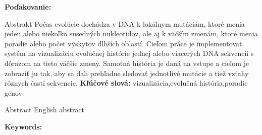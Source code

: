 \documentclass[12pt, oneside]{book}
\begin{document}
\vfill
{\bf Poďakovanie:}


\newpage 
\thispagestyle{empty}

\huge{Abstrakt}
\normalsize
\newline
\newline
Počas evolúcie dochádza v DNA k lokálnym mutáciám, ktoré menia jeden alebo niekoľko susedných nukleotidov, ale aj k väčším zmenám, ktoré menia poradie alebo počet výskytov dlhších oblastí.  Cieľom práce je implementovať systém na vizualizáciu evolučnej histórie jednej alebo viacerých DNA sekvencií s dôrazom na tieto väčšie zmeny. Samotná história je daná na vstupe a cieľom je zobraziť ju tak, aby sa dali prehľadne sledovať jednotlivé mutácie a tiež vzťahy rôznych častí sekvencie.
\newline
{\bf Kľúčové slová:} vizualizácia,evolučná história,poradie génov


\newpage 
\thispagestyle{empty}

\huge{Abstract}
\normalsize
\newline
English abstract

{\bf Keywords:} 


%
%



\newpage 

\tableofcontents



\newpage 

\listoffigures

\end{document}
